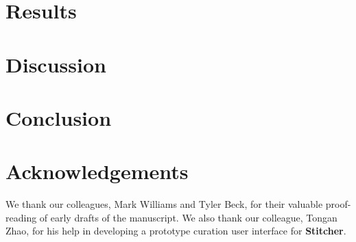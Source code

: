 \documentclass{bioinfo}
\newcommand\st{\textbf{Stitcher}}
\begin{document}
\section{Results}



\section{Discussion}


%
%

\section{Conclusion}


\section*{Acknowledgements}

We thank our colleagues, Mark Williams and Tyler Beck, for their valuable proof-reading of early drafts of the manuscript. We also thank our colleague, Tongan Zhao, for his help in developing a prototype curation user interface for \st.


%
%
%
%
%
%
%
%
\end{document}
